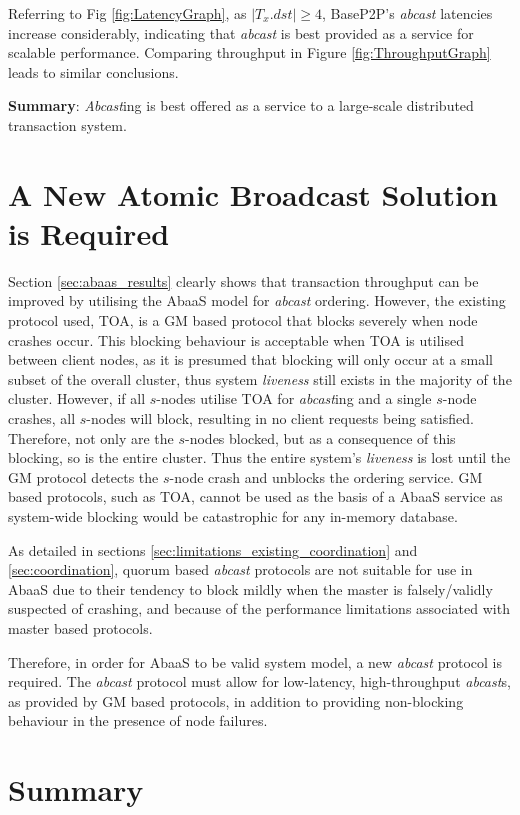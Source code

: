 Referring to Fig \ref{fig:LatencyGraph}, as $|T_x.dst| \geq 4$, BaseP2P's \emph{abcast} latencies increase considerably, indicating that \emph{abcast} is best provided as a service for scalable performance. Comparing throughput in Figure \ref{fig:ThroughputGraph} leads to similar conclusions.

\noindent \textbf{Summary}: \emph{Abcast}ing is best offered as a service to a large-scale distributed transaction system. 

\section{A New Atomic Broadcast Solution is Required}
Section \ref{sec:abaas_results} clearly shows that transaction throughput can be improved by utilising the \textsf{AbaaS} model for \emph{abcast} ordering.  However, the existing protocol used, TOA, is a GM based protocol that blocks severely when node crashes occur.  This blocking behaviour is acceptable when TOA is utilised between client nodes, as it is presumed that blocking will only occur at a small subset of the overall cluster, thus system \emph{liveness} still exists in the majority of the cluster.  However, if all $s$-nodes utilise TOA for \emph{abcast}ing and a single $s$-node crashes, all $s$-nodes will block, resulting in no client requests being satisfied. Therefore, not only are the $s$-nodes blocked, but as a consequence of this blocking, so is the entire cluster.  Thus the entire system's \emph{liveness} is lost until the GM protocol detects the $s$-node crash and unblocks the ordering service.  GM based protocols, such as TOA, cannot be used as the basis of a \textsf{AbaaS} service as system-wide blocking would be catastrophic for any in-memory database.  

As detailed in sections \ref{sec:limitations_existing_coordination} and \ref{sec:coordination}, quorum based \emph{abcast} protocols are not suitable for use in \textsf{AbaaS} due to their tendency to block mildly when the master is falsely/validly suspected of crashing, and because of the performance limitations associated with master based protocols.  

Therefore, in order for \textsf{AbaaS} to be valid system model, a new \emph{abcast} protocol is required.  The \emph{abcast} protocol must allow for low-latency, high-throughput \emph{abcast}s, as provided by GM based protocols, in addition to providing non-blocking behaviour in the presence of node failures.  

\section{Summary}